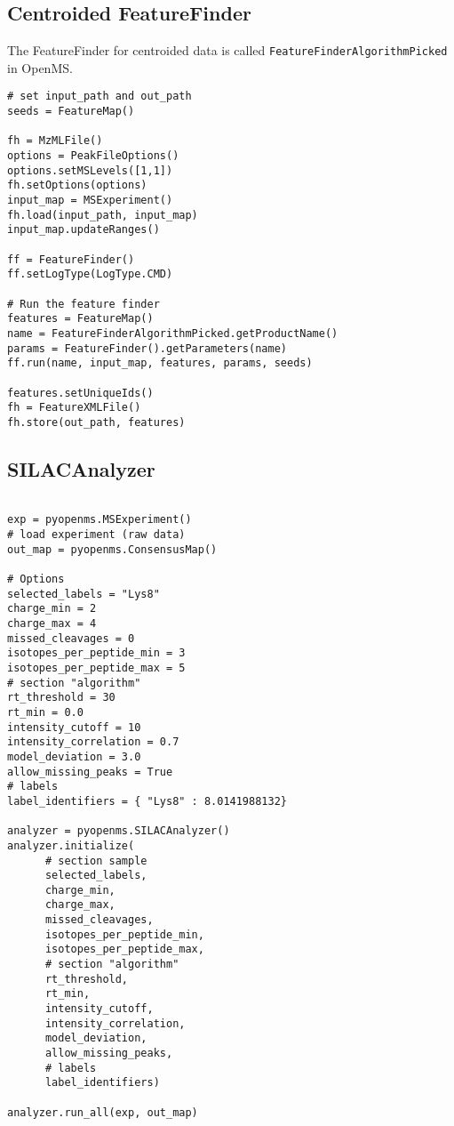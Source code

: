 \documentclass[10pt]{article}
\begin{document}
\subsection{Centroided FeatureFinder}

The FeatureFinder for centroided data is called
\texttt{FeatureFinderAlgorithmPicked} in OpenMS.

\begin{verbatim}
# set input_path and out_path
seeds = FeatureMap()

fh = MzMLFile()
options = PeakFileOptions()
options.setMSLevels([1,1])
fh.setOptions(options)
input_map = MSExperiment()
fh.load(input_path, input_map)
input_map.updateRanges()

ff = FeatureFinder()
ff.setLogType(LogType.CMD)

# Run the feature finder
features = FeatureMap()
name = FeatureFinderAlgorithmPicked.getProductName()
params = FeatureFinder().getParameters(name)
ff.run(name, input_map, features, params, seeds)

features.setUniqueIds()
fh = FeatureXMLFile()
fh.store(out_path, features)
\end{verbatim}

\subsection{SILACAnalyzer}

\begin{verbatim}

exp = pyopenms.MSExperiment()
# load experiment (raw data)
out_map = pyopenms.ConsensusMap()

# Options
selected_labels = "Lys8"
charge_min = 2
charge_max = 4
missed_cleavages = 0
isotopes_per_peptide_min = 3
isotopes_per_peptide_max = 5
# section "algorithm"
rt_threshold = 30
rt_min = 0.0
intensity_cutoff = 10
intensity_correlation = 0.7
model_deviation = 3.0
allow_missing_peaks = True
# labels
label_identifiers = { "Lys8" : 8.0141988132}

analyzer = pyopenms.SILACAnalyzer()
analyzer.initialize(
      # section sample
      selected_labels,
      charge_min,
      charge_max,
      missed_cleavages,
      isotopes_per_peptide_min,
      isotopes_per_peptide_max,
      # section "algorithm"
      rt_threshold,
      rt_min,
      intensity_cutoff,
      intensity_correlation,
      model_deviation,
      allow_missing_peaks,
      # labels
      label_identifiers)

analyzer.run_all(exp, out_map)

\end{verbatim}
\end{document}
